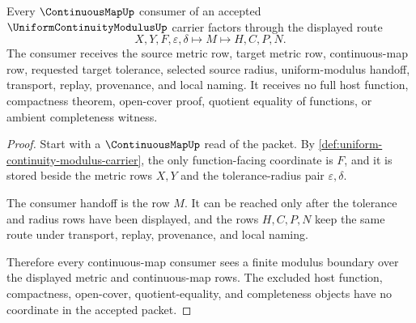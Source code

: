 \begin{theorem}
\label{thm:uniform-continuity-modulus-continuousmap-handoff}
Every $\ContinuousMapUp$ consumer of an accepted $\UniformContinuityModulusUp$ carrier factors through the displayed route
$$
X,Y,F,\varepsilon,\delta \longmapsto M \longmapsto H,C,P,N .
$$
The consumer receives the source metric row, target metric row, continuous-map row, requested target tolerance, selected source radius, uniform-modulus handoff, transport, replay, provenance, and local naming. It receives no full host function, compactness theorem, open-cover proof, quotient equality of functions, or ambient completeness witness.
\end{theorem}
\begin{proof}
Start with a $\ContinuousMapUp$ read of the packet. By \autoref{def:uniform-continuity-modulus-carrier}, the only function-facing coordinate is $F$, and it is stored beside the metric rows $X,Y$ and the tolerance-radius pair $\varepsilon,\delta$.

The consumer handoff is the row $M$. It can be reached only after the tolerance and radius rows have been displayed, and the rows $H,C,P,N$ keep the same route under transport, replay, provenance, and local naming.

Therefore every continuous-map consumer sees a finite modulus boundary over the displayed metric and continuous-map rows. The excluded host function, compactness, open-cover, quotient-equality, and completeness objects have no coordinate in the accepted packet.
\end{proof}

